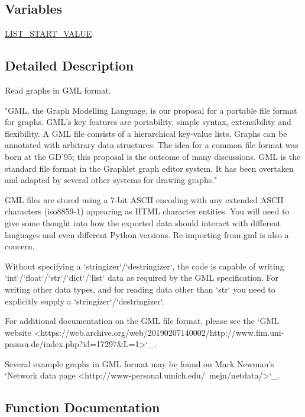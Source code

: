 \subsection*{Variables}
\begin{DoxyCompactItemize}
\item 
\hyperlink{namespacenetworkx_1_1readwrite_1_1gml_a35ad587ad358eee48dd932de00e5a950}{L\+I\+S\+T\+\_\+\+S\+T\+A\+R\+T\+\_\+\+V\+A\+L\+UE}
\end{DoxyCompactItemize}


\subsection{Detailed Description}
\begin{DoxyVerb}Read graphs in GML format.

"GML, the Graph Modelling Language, is our proposal for a portable
file format for graphs. GML's key features are portability, simple
syntax, extensibility and flexibility. A GML file consists of a
hierarchical key-value lists. Graphs can be annotated with arbitrary
data structures. The idea for a common file format was born at the
GD'95; this proposal is the outcome of many discussions. GML is the
standard file format in the Graphlet graph editor system. It has been
overtaken and adapted by several other systems for drawing graphs."

GML files are stored using a 7-bit ASCII encoding with any extended
ASCII characters (iso8859-1) appearing as HTML character entities.
You will need to give some thought into how the exported data should
interact with different languages and even different Python versions.
Re-importing from gml is also a concern.

Without specifying a `stringizer`/`destringizer`, the code is capable of
writing `int`/`float`/`str`/`dict`/`list` data as required by the GML 
specification.  For writing other data types, and for reading data other
than `str` you need to explicitly supply a `stringizer`/`destringizer`.

For additional documentation on the GML file format, please see the
`GML website <https://web.archive.org/web/20190207140002/http://www.fim.uni-passau.de/index.php?id=17297&L=1>`_.

Several example graphs in GML format may be found on Mark Newman's
`Network data page <http://www-personal.umich.edu/~mejn/netdata/>`_.
\end{DoxyVerb}
 

\subsection{Function Documentation}
\mbox{\label{namespacenetworkx_1_1readwrite_1_1gml_ab4086423cbcc357eb5887d685b019c57}} 
